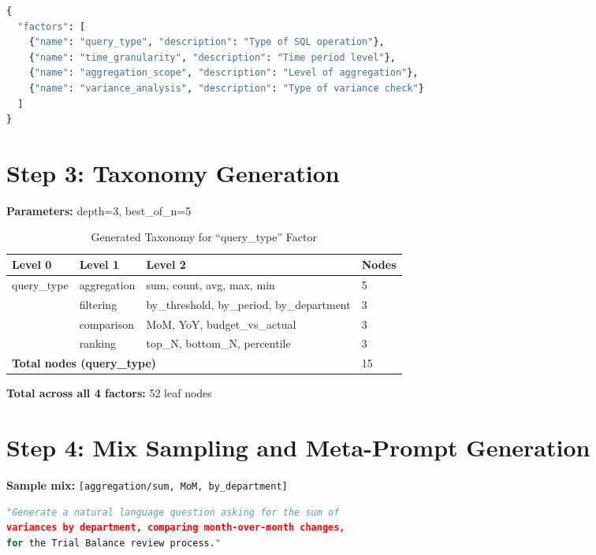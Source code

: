 \begin{lstlisting}[language=Python,caption={Factors (factors.json)}]
{
  "factors": [
    {"name": "query_type", "description": "Type of SQL operation"},
    {"name": "time_granularity", "description": "Time period level"},
    {"name": "aggregation_scope", "description": "Level of aggregation"},
    {"name": "variance_analysis", "description": "Type of variance check"}
  ]
}
\end{lstlisting}

\section*{Step 3: Taxonomy Generation}

\textbf{Parameters:} depth=3, best\_of\_n=5

\begin{table}[H]
\centering
\caption{Generated Taxonomy for ``query\_type'' Factor}
\begin{tabular}{llll}
\toprule
\textbf{Level 0} & \textbf{Level 1} & \textbf{Level 2} & \textbf{Nodes} \\
\midrule
query\_type & aggregation & sum, count, avg, max, min & 5 \\
            & filtering & by\_threshold, by\_period, by\_department & 3 \\
            & comparison & MoM, YoY, budget\_vs\_actual & 3 \\
            & ranking & top\_N, bottom\_N, percentile & 3 \\
\midrule
\multicolumn{3}{l}{\textbf{Total nodes (query\_type)}} & 15 \\
\bottomrule
\end{tabular}
\end{table}

\textbf{Total across all 4 factors:} 52 leaf nodes

\section*{Step 4: Mix Sampling and Meta-Prompt Generation}

\textbf{Sample mix:} \texttt{[aggregation/sum, MoM, by\_department]}

\begin{lstlisting}[language=Python,caption={Meta-prompt generated}]
"Generate a natural language question asking for the sum of 
variances by department, comparing month-over-month changes, 
for the Trial Balance review process."
\end{lstlisting}

